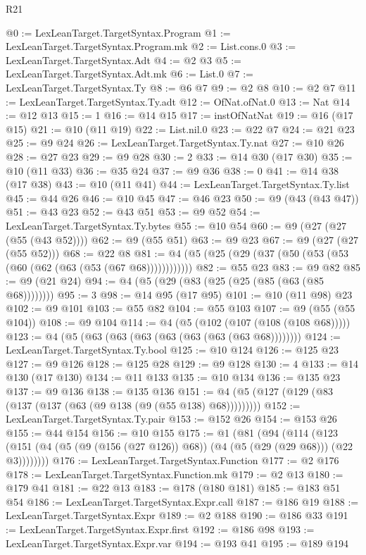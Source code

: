\begin{lexlean}{R21}
\begin{coremodule}
@0 := LexLeanTarget.TargetSyntax.Program
@1 := LexLeanTarget.TargetSyntax.Program.mk
@2 := List.cons.{0}
@3 := LexLeanTarget.TargetSyntax.Adt
@4 := @2 @3
@5 := LexLeanTarget.TargetSyntax.Adt.mk
@6 := List.{0}
@7 := LexLeanTarget.TargetSyntax.Ty
@8 := @6 @7
@9 := @2 @8
@10 := @2 @7
@11 := LexLeanTarget.TargetSyntax.Ty.adt
@12 := OfNat.ofNat.{0}
@13 := Nat
@14 := @12 @13
@15 := 1
@16 := @14 @15
@17 := instOfNatNat
@19 := @16 (@17 @15)
@21 := @10 (@11 @19)
@22 := List.nil.{0}
@23 := @22 @7
@24 := @21 @23
@25 := @9 @24
@26 := LexLeanTarget.TargetSyntax.Ty.nat
@27 := @10 @26
@28 := @27 @23
@29 := @9 @28
@30 := 2
@33 := @14 @30 (@17 @30)
@35 := @10 (@11 @33)
@36 := @35 @24
@37 := @9 @36
@38 := 0
@41 := @14 @38 (@17 @38)
@43 := @10 (@11 @41)
@44 := LexLeanTarget.TargetSyntax.Ty.list
@45 := @44 @26
@46 := @10 @45
@47 := @46 @23
@50 := @9 (@43 (@43 @47))
@51 := @43 @23
@52 := @43 @51
@53 := @9 @52
@54 := LexLeanTarget.TargetSyntax.Ty.bytes
@55 := @10 @54
@60 := @9 (@27 (@27 (@55 (@43 @52))))
@62 := @9 (@55 @51)
@63 := @9 @23
@67 := @9 (@27 (@27 (@55 @52)))
@68 := @22 @8
@81 := @4 (@5 (@25 (@29 (@37 (@50 (@53 (@53 (@60 (@62 (@63 (@53 (@67 @68))))))))))))
@82 := @55 @23
@83 := @9 @82
@85 := @9 (@21 @24)
@94 := @4 (@5 (@29 (@83 (@25 (@25 (@85 (@63 (@85 @68))))))))
@95 := 3
@98 := @14 @95 (@17 @95)
@101 := @10 (@11 @98) @23
@102 := @9 @101
@103 := @55 @82
@104 := @55 @103
@107 := @9 (@55 (@55 @104))
@108 := @9 @104
@114 := @4 (@5 (@102 (@107 (@108 (@108 @68)))))
@123 := @4 (@5 (@63 (@63 (@63 (@63 (@63 (@63 (@63 @68))))))))
@124 := LexLeanTarget.TargetSyntax.Ty.bool
@125 := @10 @124
@126 := @125 @23
@127 := @9 @126
@128 := @125 @28
@129 := @9 @128
@130 := 4
@133 := @14 @130 (@17 @130)
@134 := @11 @133
@135 := @10 @134
@136 := @135 @23
@137 := @9 @136
@138 := @135 @136
@151 := @4 (@5 (@127 (@129 (@83 (@137 (@137 (@63 (@9 @138 (@9 (@55 @138) @68)))))))))
@152 := LexLeanTarget.TargetSyntax.Ty.pair
@153 := @152 @26
@154 := @153 @26
@155 := @44 @154
@156 := @10 @155
@175 := @1
    (@81
      (@94
        (@114
          (@123 (@151 (@4 (@5 (@9 (@156 (@27 @126)) @68)) (@4 (@5 (@29 (@29 @68))) (@22 @3))))))))
@176 := LexLeanTarget.TargetSyntax.Function
@177 := @2 @176
@178 := LexLeanTarget.TargetSyntax.Function.mk
@179 := @2 @13
@180 := @179 @41
@181 := @22 @13
@183 := @178 (@180 @181)
@185 := @183 @51 @54
@186 := LexLeanTarget.TargetSyntax.Expr.call
@187 := @186 @19
@188 := LexLeanTarget.TargetSyntax.Expr
@189 := @2 @188
@190 := @186 @33
@191 := LexLeanTarget.TargetSyntax.Expr.first
@192 := @186 @98
@193 := LexLeanTarget.TargetSyntax.Expr.var
@194 := @193 @41
@195 := @189 @194

\end{coremodule}
\end{lexlean}
